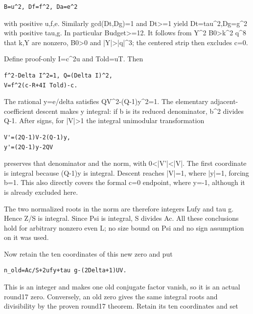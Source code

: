 \begingroup\small
\begin{verbatim}
B=u^2, Df=f^2, Da=e^2
\end{verbatim}
\endgroup

with positive u,f,e. Similarly gcd(Dt,Dg)=1 and Dt>=1 yield
Dt=tau\textasciicircum{}2,Dg=g\textasciicircum{}2 with positive tau,g. In particular Budget>=12.
It follows from Y\textasciicircum{}2 B0>k\textasciicircum{}2 q\textasciicircum{}8 that k,Y are nonzero, B0>0 and
|Y|>|q|\textasciicircum{}3; the centered strip then excludes c=0.

Define proof-only I=c\textasciicircum{}2u and Told=uT. Then

\begingroup\small
\begin{verbatim}
f^2-Delta I^2=1, Q=(Delta I)^2,
V=f^2(c-R+4I Told)-c.
\end{verbatim}
\endgroup

The rational y=e/delta satisfies QV\textasciicircum{}2-(Q-1)y\textasciicircum{}2=1. The elementary
adjacent-coefficient descent makes y integral: if b is its reduced
denominator, b\textasciicircum{}2 divides Q-1. After signs, for |V|>1 the integral
unimodular transformation

\begingroup\small
\begin{verbatim}
V'=(2Q-1)V-2(Q-1)y,
y'=(2Q-1)y-2QV
\end{verbatim}
\endgroup

preserves that denominator and the norm, with 0<|V'|<|V|. The first
coordinate is integral because (Q-1)y is integral. Descent reaches
|V|=1, where |y|=1, forcing b=1. This also directly covers the formal
c=0 endpoint, where y=-1, although it is already excluded here.

The two normalized roots in the norm are therefore integers Lufy and
tau g. Hence Z/S is integral. Since Psi is integral, S divides Ac.
All these conclusions hold for arbitrary nonzero even L; no size bound
on Psi and no sign assumption on it was used.

Now retain the ten coordinates of this new zero and put

\begingroup\small
\begin{verbatim}
n_old=Ac/S+2ufy+tau g-(2Delta+1)UV.
\end{verbatim}
\endgroup

This is an integer and makes one old conjugate factor vanish, so it is an
actual round17 zero. Conversely, an old zero gives the same integral
roots and divisibility by the proven round17 theorem. Retain its ten
coordinates and set

